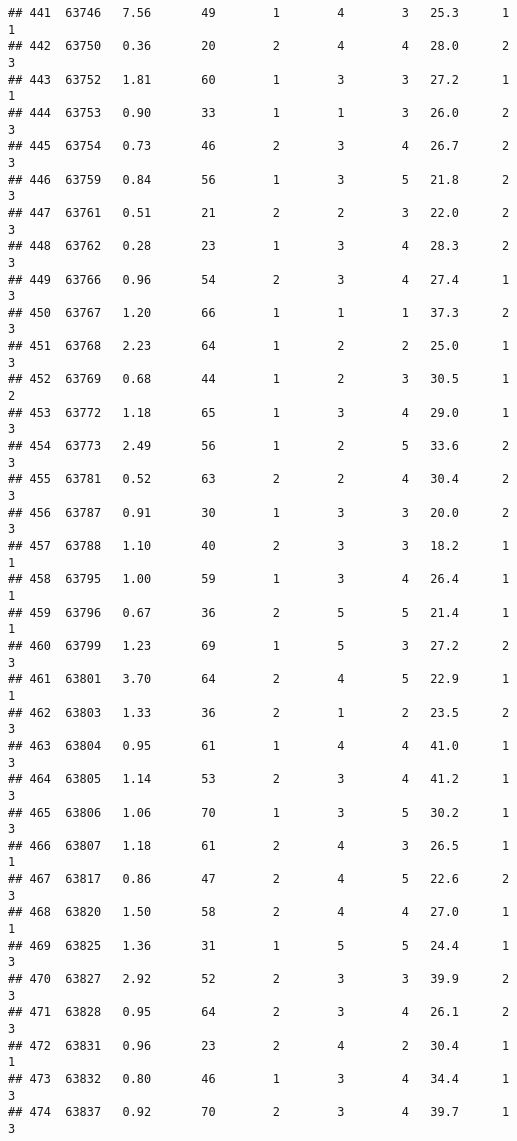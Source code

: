 \documentclass[
]{article}
\begin{document}
\begin{verbatim}
## 441  63746   7.56       49        1        4        3   25.3      1      1
## 442  63750   0.36       20        2        4        4   28.0      2      3
## 443  63752   1.81       60        1        3        3   27.2      1      1
## 444  63753   0.90       33        1        1        3   26.0      2      3
## 445  63754   0.73       46        2        3        4   26.7      2      3
## 446  63759   0.84       56        1        3        5   21.8      2      3
## 447  63761   0.51       21        2        2        3   22.0      2      3
## 448  63762   0.28       23        1        3        4   28.3      2      3
## 449  63766   0.96       54        2        3        4   27.4      1      3
## 450  63767   1.20       66        1        1        1   37.3      2      3
## 451  63768   2.23       64        1        2        2   25.0      1      3
## 452  63769   0.68       44        1        2        3   30.5      1      2
## 453  63772   1.18       65        1        3        4   29.0      1      3
## 454  63773   2.49       56        1        2        5   33.6      2      3
## 455  63781   0.52       63        2        2        4   30.4      2      3
## 456  63787   0.91       30        1        3        3   20.0      2      3
## 457  63788   1.10       40        2        3        3   18.2      1      1
## 458  63795   1.00       59        1        3        4   26.4      1      1
## 459  63796   0.67       36        2        5        5   21.4      1      1
## 460  63799   1.23       69        1        5        3   27.2      2      3
## 461  63801   3.70       64        2        4        5   22.9      1      1
## 462  63803   1.33       36        2        1        2   23.5      2      3
## 463  63804   0.95       61        1        4        4   41.0      1      3
## 464  63805   1.14       53        2        3        4   41.2      1      3
## 465  63806   1.06       70        1        3        5   30.2      1      3
## 466  63807   1.18       61        2        4        3   26.5      1      1
## 467  63817   0.86       47        2        4        5   22.6      2      3
## 468  63820   1.50       58        2        4        4   27.0      1      1
## 469  63825   1.36       31        1        5        5   24.4      1      3
## 470  63827   2.92       52        2        3        3   39.9      2      3
## 471  63828   0.95       64        2        3        4   26.1      2      3
## 472  63831   0.96       23        2        4        2   30.4      1      1
## 473  63832   0.80       46        1        3        4   34.4      1      3
## 474  63837   0.92       70        2        3        4   39.7      1      3

\end{verbatim}
\end{document}
